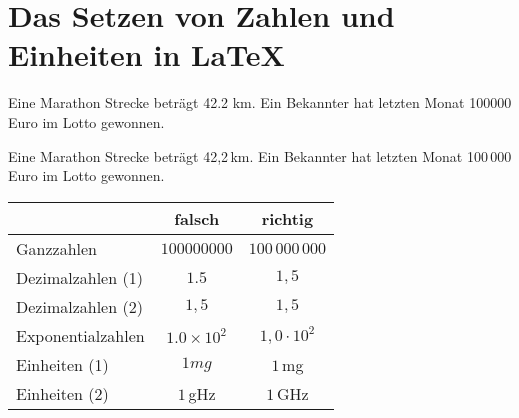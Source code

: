 \documentclass[11pt,a4paper,parskip]{scrartcl}
\begin{document}
%
\section{Das Setzen von Zahlen und Einheiten in \LaTeX}
%
Eine Marathon Strecke beträgt 42.2 km. Ein Bekannter hat letzten Monat 100000 Euro im Lotto gewonnen.

Eine Marathon Strecke beträgt 42{,}2\,km. Ein Bekannter hat letzten Monat 100\,000 Euro im Lotto gewonnen.
%
\begin{center}
  \begin{tabular}{lcc}
    \toprule
    & falsch & richtig \\
    \midrule
    Ganzzahlen        & $100000000$        & $100\,000\,000$ \\
    Dezimalzahlen (1) & $1.5$              & $1{,}5$ \\
    Dezimalzahlen (2) & $1,5$              & $1{,}5$ \\
    Exponentialzahlen & $1.0\times 10^{2}$  & $1{,}0\cdot 10^{2}$ \\
    Einheiten (1)     & $1 mg$             & $1$\,mg \\
    Einheiten (2)     & $1$\,gHz           & $1$\,GHz \\
    \bottomrule
  \end{tabular}
\end{center}
%
\end{document}
